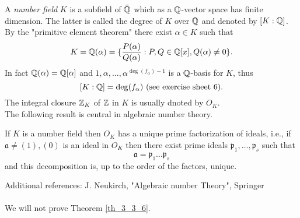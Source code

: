 \documentclass[NumTh.tex]{subfiles}
\begin{document}
A \emph{number field} $K$ is a subfield of $\bar{\mathbb{Q}}$ which as a $\mathbb{Q}$-vector space has finite dimension.
The latter is called the degree of $K$ over $\mathbb{Q}$ and denoted by $[K:\mathbb{Q}]$.
By the "primitive element theorem" there exist $\alpha \in K$ such that 
\[ K = \mathbb{Q}(\alpha) = \{ \frac{P(\alpha)}{Q(\alpha)} : P,Q \in \mathbb{Q}[x], Q(\alpha) \neq 0 \} \text{.} \]
In fact $\mathbb{Q}(\alpha) = \mathbb{Q}[\alpha]$ and $1,\alpha,\dots,\alpha^{\deg(f_\alpha) - 1}$ is a $\mathbb{Q}$-basis for $K$,
thus 
\[ [K:\mathbb{Q}] = \deg(f_\alpha) \text{ (see exercise sheet 6).} \]
The integral closure $\mathbb{Z}_K$ of $\mathbb{Z}$ in $K$ is usually dnoted by $O_K$.\\

The following result is central in algebraic number theory.

\begin{theorem}\label{th_3_3_6}
  If $K$ is a number field then $O_K$ has a unique prime factorization of ideals,
  i.e., if $\mathfrak{a} \neq (1),(0)$ is an ideal in $O_K$ then there exist prime ideals $\mathfrak{p}_1,\dots,\mathfrak{p}_s$ such that
  \[ \mathfrak{a} = \mathfrak{p}_1 \dots \mathfrak{p}_s \]
  and this decomposition is, up to the order of the factors, unique.
\end{theorem}


Additional references: J. Neukirch, "Algebraic number Theory", Springer \\
\\
We will not prove Theorem \ref{th_3_3_6}.\\
\\
\end{document}
